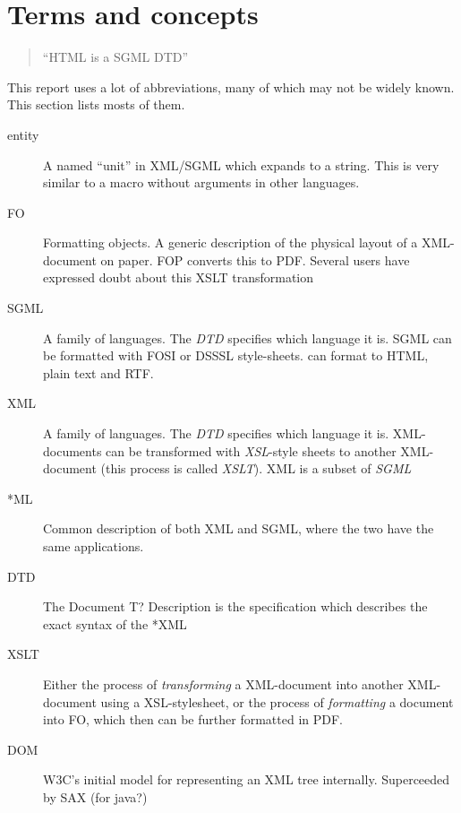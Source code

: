 
\section{Terms and concepts}

\begin{quotation}
  ``HTML is a SGML DTD''
\end{quotation}

This report uses a lot of abbreviations, many of which may not be
widely known.  This section lists mosts of them.

\begin{description}

\item[entity] A named ``unit'' in XML/SGML which expands to a string.
  This is very similar to a macro without arguments in other
  languages.
  
\item[FO] Formatting objects.  A generic description of the physical
  layout of a XML-document on paper.  FOP converts this to PDF.
  \textsf{Several users have expressed doubt about this XSLT
    transformation}
  
\item[SGML] A family of languages.  The \textit{DTD} specifies which
  language it is.  SGML can be formatted with FOSI or DSSSL
  style-sheets.   can format to HTML, plain text and
  RTF. 
  
\item[XML] A family of languages.  The \textit{DTD} specifies which
  language it is.  XML-documents can be transformed with
  \textit{XSL}-style sheets to another XML-document (this process is
  called \textit{XSLT}).  XML is a subset of \textit{SGML}


\item[*ML] Common description of both XML and SGML, where the two have
  the same applications.

\item[DTD] The \textsf{Document T? Description} is the specification
  which describes the exact syntax of the *XML


\item[XSLT] Either the process of \textit{transforming} a XML-document into
  another XML-document using a XSL-stylesheet, or the process of
  \textit{formatting} a document into FO, which then can be further
  formatted in PDF.

\item[DOM] \textsf{W3C's initial model for representing an XML tree
    internally.  Superceeded by SAX (\textsf{for java?)}}
  

\end{description}
